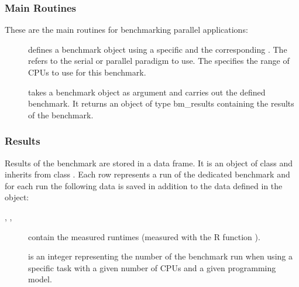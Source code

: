 \subsubsection{Main Routines}

These are the main routines for benchmarking parallel applications:

\begin{description}
\item[]
  defines a benchmark object using a specific  and the
  corresponding . The  refers to the serial or
  parallel paradigm to use. The  specifies the range
  of CPUs to use for this benchmark. 
\item[] takes a benchmark object as argument
  and carries out the defined benchmark. It returns an object of type
  bm\_results containing the
  results of the benchmark.
\end{description}

\subsubsection{Results}

Results of the benchmark are stored in a data frame. It is an object
of class  and inherits from class
. Each row represents a run of the dedicated
benchmark and for each run the following data is saved in addition to
the data defined in the  object:
\begin{description}
\item[, , ] contain the
  measured runtimes 
  (measured with the R function ). 
\item[] is an integer representing the number of the
  benchmark run when using a specific task with a given number of CPUs
  and a given programming model.
\end{description} 

